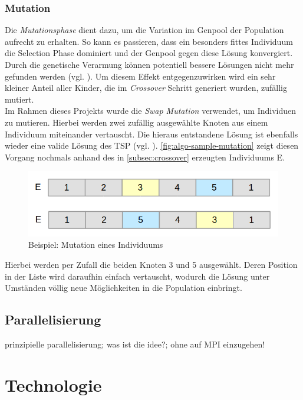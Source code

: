 \documentclass[12pt,a4paper]{scrreprt}
\begin{document}
\subsection{Mutation}
\label{subsec:mutation}

Die \textit{Mutationsphase} dient dazu, um die Variation im Genpool der Population aufrecht zu erhalten. So kann es passieren, dass ein besonders fittes Individuum die Selection Phase dominiert und der Genpool gegen diese Lösung konvergiert. Durch die genetische Verarmung können potentiell bessere Lösungen nicht mehr gefunden werden (vgl. \cite{rongqu14}). Um diesem Effekt entgegenzuwirken wird ein sehr kleiner Anteil aller Kinder, die im \textit{Crossover} Schritt generiert wurden, zufällig mutiert.\\
Im Rahmen dieses Projekts wurde die \textit{Swap Mutation} verwendet, um Individuen zu mutieren. Hierbei werden zwei zufällig ausgewählte Knoten aus einem Individuum miteinander vertauscht. Die hieraus entstandene Lösung ist ebenfalls wieder eine valide Lösung des TSP (vgl. \cite{jacobsen12B}). \autoref{fig:algo-sample-mutation} zeigt diesen Vorgang nochmals anhand des in \autoref{subsec:crossover} erzeugten Individuums E.


\begin{figure}[ht]
  	\centering
	\includegraphics[width=400pt]{images/algo_05_mutation.png}
	\caption{Beispiel: Mutation eines Individuums}
	\label{fig:algo-sample-mutation}
\end{figure}

Hierbei werden per Zufall die beiden Knoten 3 und 5 ausgewählt. Deren Position in der Liste wird daraufhin einfach vertauscht, wodurch die Lösung unter Umständen völlig neue Möglichkeiten in die Population einbringt.

\section{Parallelisierung}
\label{sec:parallelisierung}

prinzipielle parallelisierung; was ist die idee?; ohne auf MPI einzugehen!

\chapter{Technologie}
\label{chap:technologie}
\end{document}
